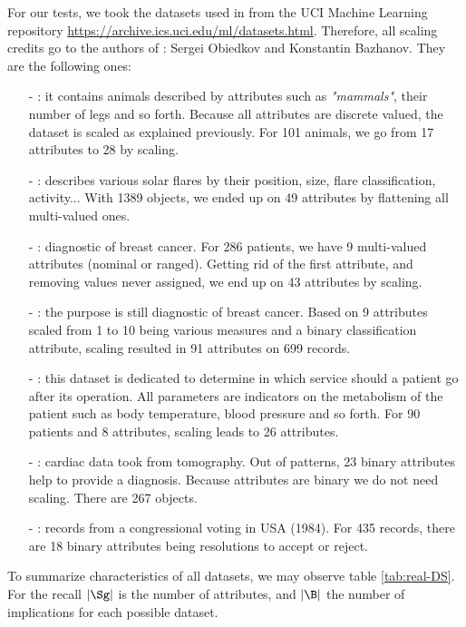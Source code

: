 For our tests, we took the datasets used in \cite{bazhanov_optimizations_2014} from the UCI Machine Learning repository \url{https://archive.ics.uci.edu/ml/datasets.html}. Therefore, all scaling credits go to the authors of \cite{bazhanov_optimizations_2014}: Sergei Obiedkov and Konstantin Bazhanov. They are the following ones:
\begin{itemize}
	\item[-] : it contains animals described by attributes such as \textit{"mammals"}, their number of legs and so forth. Because all attributes are discrete valued, the dataset is scaled as explained previously. For 101 animals, we go from 17 attributes to 28 by scaling.
	\item[-] : describes various solar flares by their position, size, flare classification, activity... With 1389 objects, we ended up on 49 attributes by flattening all multi-valued ones.
	\item[-] : diagnostic of breast cancer. For 286 patients, we have 9 multi-valued attributes (nominal or ranged). Getting rid of the first attribute, and removing values never assigned, we end up
	on 43 attributes by scaling.
	\item[-] : the purpose is still diagnostic of
	breast cancer. Based on 9 attributes scaled from 1 to 10 being various measures and a binary classification attribute, scaling resulted in 91 attributes on 699 records.
	\item[-] : this dataset is dedicated to determine in which service should a patient go after its operation. All parameters are indicators on the metabolism of the patient such as body temperature,
	blood pressure and so forth. For 90 patients and 8 attributes, scaling leads to 26 attributes.
	\item[-] : cardiac data took from tomography. Out of patterns, 23 binary attributes help to provide a diagnosis. Because attributes are binary we do not need scaling. There are 267 objects.
	\item[-] : records from a congressional voting in USA
	(1984). For 435 records, there are 18 binary attributes being resolutions
	to accept or reject.
\end{itemize}

To summarize characteristics of all datasets, we may observe table \ref{tab:real-DS}. For the recall $|\Sg|$ is the number of attributes, and 
$|\B|$ the number of implications for each possible dataset.

